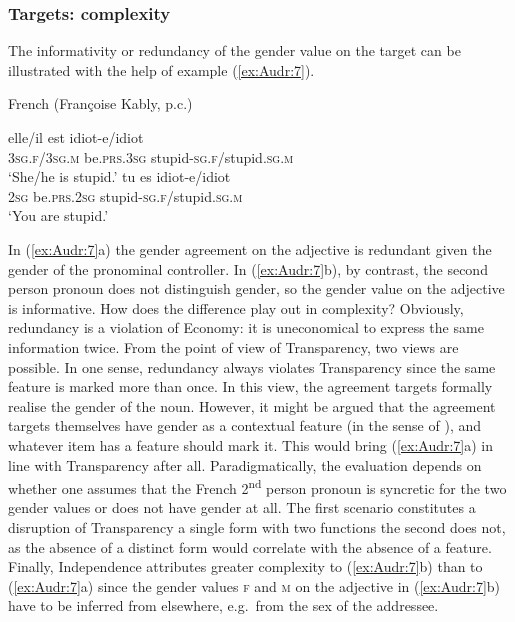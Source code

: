 \documentclass[output=collectionpaper]{langsci/langscibook}
\begin{document}
\subsubsection{Targets: complexity}
\label{sec:Audr:3.3.2}

The informativity or redundancy of the gender value on the target can be illustrated with the help of example (\ref{ex:Audr:7}).

\ea
\label{ex:Audr:7}
French (Françoise Kably, p.c.)\\
\begin{xlist}
\ex
\gll elle/il est idiot-e/idiot\\
     \textsc{3sg.f/3sg.m} be\textsc{.prs.3sg} stupid\textsc{{}-sg.f/}stupid\textsc{.sg.m}\\
\glt `She/he is stupid.'
\ex
\gll tu es idiot-e/idiot\\
     \textsc{2sg} be\textsc{.prs.2sg} stupid\textsc{{}-sg.f/}stupid\textsc{.sg.m}\\
\glt `You are stupid.'
\end{xlist}
\z

In (\ref{ex:Audr:7}a) the gender agreement on the adjective is redundant given the gender of the pronominal controller. In (\ref{ex:Audr:7}b), by contrast, the second person pronoun does not distinguish gender, so the gender value on the adjective is informative. How does the difference play out in complexity? Obviously, redundancy is a violation of Economy: it is uneconomical to express the same information twice. From the point of view of Transparency, two views are possible. In one sense, redundancy always violates Transparency since the same feature is marked more than once. In this view, the agreement targets formally realise the gender of the noun. However, it might be argued that the agreement targets themselves have gender as a contextual feature (in the sense of \citealt{Booij2006}), and whatever item has a feature should mark it. This would bring (\ref{ex:Audr:7}a) in line with Transparency after all. Paradigmatically, the evaluation depends on whether one assumes that the French 2\textsuperscript{nd} person pronoun is syncretic for the two gender values or does not have gender at all. The first scenario constitutes a disruption of Transparency \textendash{} a single form with two functions \textendash{} the second does not, as the absence of a distinct form would correlate with the absence of a feature. Finally, Independence attributes greater complexity to (\ref{ex:Audr:7}b) than to (\ref{ex:Audr:7}a) since the gender values \textsc{f} and \textsc{m} on the adjective in (\ref{ex:Audr:7}b) have to be inferred from elsewhere, e.g.\ from the sex of the addressee.
\end{document}
